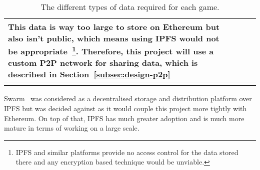 \begin{longtable}{ p{} p{} p{} p{} }
  \vspace{1mm}
  This data is way too large to store on Ethereum but also isn't public, which means using IPFS would not be appropriate~\footnote{IPFS and similar platforms provide no access control for the data stored there and any encryption based technique would be unviable.}. Therefore, this project will use a custom P2P network for sharing data, which is described in Section~\ref{subsec:design-p2p} 
  \\\bottomrule\bottomrule
  \caption{The different types of data required for each game.}
\end{longtable}

\noindent 
Swarm~\cite{hartman_swarm_1999} was considered as a decentralised storage and distribution platform over IPFS but was decided against as it would couple this project more tightly with Ethereum. On top of that, IPFS has much greater adoption and is much more mature in terms of working on a large scale.